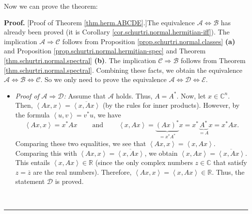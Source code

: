 \documentclass[numbers=enddot,12pt,final,onecolumn,notitlepage]{scrartcl}%
\numberwithin{exer}{subsection}
\theoremstyle{definition}
\newenvironment{proof}[1][Proof]{\noindent\textbf{#1.} }{\ \rule{0.5em}{0.5em}}
\begin{document}
Now we can prove the theorem:

\begin{proof}
[Proof of Theorem \ref{thm.herm.ABCDE}.]The equivalence $\mathcal{A}%
\Longleftrightarrow\mathcal{B}$ has already been proved (it is Corollary
\ref{cor.schurtri.normal.hermitian-iff}). The implication $\mathcal{A}%
\Longrightarrow\mathcal{C}$ follows from Proposition
\ref{prop.schurtri.normal.classes} \textbf{(a)} and Proposition
\ref{prop.schurtri.normal.hermitian-spec} and Theorem
\ref{thm.schurtri.normal.spectral} \textbf{(b)}. The implication
$\mathcal{C}\Longrightarrow\mathcal{B}$ follows from Theorem
\ref{thm.schurtri.normal.spectral}. Combining these facts, we obtain the
equivalence $\mathcal{A}\Longleftrightarrow\mathcal{B}\Longleftrightarrow
\mathcal{C}$. So we only need to prove the equivalence $\mathcal{A}%
\Longleftrightarrow\mathcal{D}\Longleftrightarrow\mathcal{E}$.

\begin{itemize}
\item \textit{Proof of }$\mathcal{A}\Longrightarrow\mathcal{D}$\textit{:}
Assume that $\mathcal{A}$ holds. Thus, $A=A^{\ast}$. Now, let $x\in
\mathbb{C}^{n}$. Then, $\left\langle Ax,x\right\rangle =\overline{\left\langle
x,Ax\right\rangle }$ (by the rules for inner products). However, by the
formula $\left\langle u,v\right\rangle =v^{\ast}u$, we have%
\[
\left\langle Ax,x\right\rangle =x^{\ast}Ax\ \ \ \ \ \ \ \ \ \ \text{and}%
\ \ \ \ \ \ \ \ \ \ \left\langle x,Ax\right\rangle =\underbrace{\left(
Ax\right)  ^{\ast}}_{=x^{\ast}A^{\ast}}x=x^{\ast}\underbrace{A^{\ast}}%
_{=A}x=x^{\ast}Ax.
\]
Comparing these two equalities, we see that $\left\langle Ax,x\right\rangle
=\left\langle x,Ax\right\rangle $. Comparing this with $\left\langle
Ax,x\right\rangle =\overline{\left\langle x,Ax\right\rangle }$, we obtain
$\left\langle x,Ax\right\rangle =\overline{\left\langle x,Ax\right\rangle }$.
This entails $\left\langle x,Ax\right\rangle \in\mathbb{R}$ (since the only
complex numbers $z\in\mathbb{C}$ that satisfy $z=\overline{z}$ are the real
numbers). Therefore, $\left\langle Ax,x\right\rangle =\left\langle
x,Ax\right\rangle \in\mathbb{R}$. Thus, the statement $\mathcal{D}$ is proved.


\end{itemize}
\end{proof}
\end{document}
